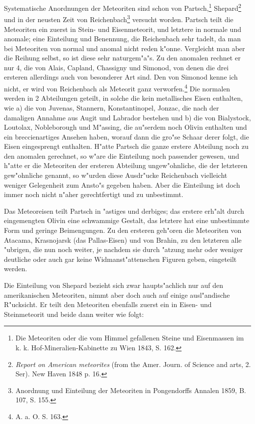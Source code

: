 \documentclass[a4paper, 11pt, oneside]{article}
\begin{document}
Systematische Anordnungen der Meteoriten sind schon von Partsch,\footnote{Die Meteoriten oder die vom Himmel gefallenen Steine und Eisenmassen im k. k. Hof-Mineralien-Kabinette zu Wien 1843, S. 162.} Shepard\footnote{\emph{Report on American meteorites} (from the Amer. Journ. of Science and arts, 2. Ser). New Haven 1848 p. 16.} und in der neusten Zeit von Reichenbach\footnote{Anordnung und Einteilung der Meteoriten in Pongendorffs Annalen 1859, B. 107, S. 155.} versucht worden. Partsch teilt die Meteoriten ein zuerst in Stein- und Eisenmeteorit, und letztere in normale und anomale; eine Einteilung und Benennung, die Reichenbach sehr tadelt, da man bei Meteoriten von normal und anomal nicht reden k"onne. Vergleicht man aber die Reihung selbst, so ist diese sehr naturgem"a"s. Zu den anomalen rechnet er nur 4, die von Alais, Capland, Chassigny und Simonod, von denen die drei ersteren allerdings auch von besonderer Art sind. Den von Simonod kenne ich nicht, er wird von Reichenbach als Meteorit ganz verworfen.\footnote{A. a. O. S. 163.} Die normalen werden in 2 Abteilungen geteilt, in solche die kein metallisches Eisen enthalten, wie a) die von Juvenas, Stannern, Konstantinopel, Jonzac, die nach der damaligen Annahme aus Augit und Labrador bestehen und b) die von Bialystock, Loutolax, Nobleborough und M"assing, die au"serdem noch Olivin enthalten und ein breccienartiges Ansehen haben, worauf dann die gro"se Schaar derer folgt, die Eisen eingesprengt enthalten. H"atte Partsch die ganze erstere Abteilung noch zu den anomalen gerechnet, so w"are die Einteilung noch passender gewesen, und h"atte er die Meteoriten der ersteren Abteilung ungew"ohnliche, die der letzteren gew"ohnliche genannt, so w"urden diese Ausdr"ucke Reichenbach vielleicht weniger Gelegenheit zum Ansto"s gegeben haben. Aber die Einteilung ist doch immer noch nicht n"aher gerechtfertigt und zu unbestimmt.

Das Meteoreisen teilt Partsch in "astiges und derbiges; das erstere erh"alt durch eingemengten Olivin eine schwammige Gestalt, das letztere hat eine unbestimmte Form und geringe Beimengungen. Zu den ersteren geh"oren die Meteoriten von Atacama, Krasnojarsk (das Pallas-Eisen) und von Brahin, zu den letzteren alle "ubrigen, die nun noch weiter, je nachdem sie durch "atzung mehr oder weniger deutliche oder auch gar keine Widmanst"attenschen Figuren geben, eingeteilt werden.

Die Einteilung von Shepard bezieht sich zwar haupts"achlich nur auf den amerikanischen Meteoriten, nimmt aber doch auch auf einige ausl"andische R"ucksicht. Er teilt den Meteoriten ebenfalls zuerst ein in Eisen- und Steinmeteorit und beide dann weiter wie folgt:
\end{document}

